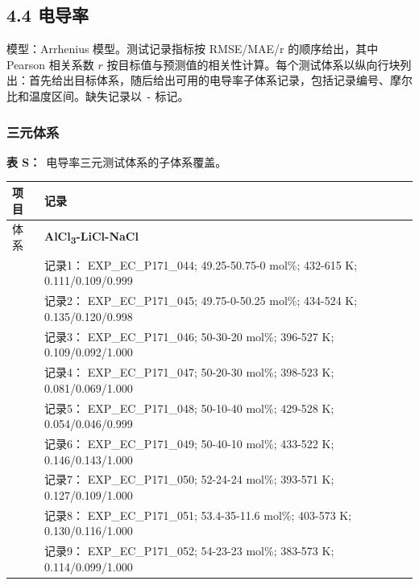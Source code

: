 \documentclass[12pt]{article}
\providecommand{\passthrough}[1]{#1}
\renewcommand{\thetable}{S\arabic{table}}
\newcommand{\sitablecaption}[1]{\Needspace{12\baselineskip}\par\noindent\stepcounter{table}\textbf{表 \thetable：}~#1\par\nobreak\smallskip}
\newcommand{\silongtablecaption}[1]{\sitablecaption{#1}\addtocounter{table}{-1}}
\begin{document}
\subsection*{4.4 电导率}\label{electrical-conductivity}

模型：Arrhenius 模型。测试记录指标按 RMSE/MAE/r 的顺序给出，其中 Pearson 相关系数 \(r\) 按目标值与预测值的相关性计算。每个测试体系以纵向行块列出：首先给出目标体系，随后给出可用的电导率子体系记录，包括记录编号、摩尔比和温度区间。缺失记录以 \passthrough{\lstinline!-!} 标记。

\subsubsection*{三元体系}\label{ternary-system-5}

{
\silongtablecaption{电导率三元测试体系的子体系覆盖。}
\begin{longtable}[]{@{}
  >{\raggedright\arraybackslash}p{}
  >{\raggedright\arraybackslash}p{}@{}}
\toprule\noalign{}
\begin{minipage}[b]{\linewidth}\raggedright
项目
\end{minipage} & \begin{minipage}[b]{\linewidth}\raggedright
记录
\end{minipage} \\
\midrule\noalign{}
\endhead
\bottomrule\noalign{}
\endlastfoot
体系 & \textbf{AlCl\textsubscript{3}-LiCl-NaCl} \\
 & 记录1： EXP\_EC\_P171\_044; 49.25-50.75-0 mol\%; 432-615 K; 0.111/0.109/0.999 \\
 & 记录2： EXP\_EC\_P171\_045; 49.75-0-50.25 mol\%; 434-524 K; 0.135/0.120/0.998 \\
 & 记录3： EXP\_EC\_P171\_046; 50-30-20 mol\%; 396-527 K; 0.109/0.092/1.000 \\
 & 记录4： EXP\_EC\_P171\_047; 50-20-30 mol\%; 398-523 K; 0.081/0.069/1.000 \\
 & 记录5： EXP\_EC\_P171\_048; 50-10-40 mol\%; 429-528 K; 0.054/0.046/0.999 \\
 & 记录6： EXP\_EC\_P171\_049; 50-40-10 mol\%; 433-522 K; 0.146/0.143/1.000 \\
 & 记录7： EXP\_EC\_P171\_050; 52-24-24 mol\%; 393-571 K; 0.127/0.109/1.000 \\
 & 记录8： EXP\_EC\_P171\_051; 53.4-35-11.6 mol\%; 403-573 K; 0.130/0.116/1.000 \\
 & 记录9： EXP\_EC\_P171\_052; 54-23-23 mol\%; 383-573 K; 0.114/0.099/1.000 \\

\end{longtable}}
\end{document}
